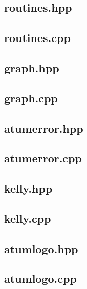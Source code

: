 \subsection{routines.hpp}

\subsection{routines.cpp}

\subsection{graph.hpp}

\subsection{graph.cpp}

\subsection{atumerror.hpp}

\subsection{atumerror.cpp}

\subsection{kelly.hpp}

\subsection{kelly.cpp}

\subsection{atumlogo.hpp}

\subsection{atumlogo.cpp}

